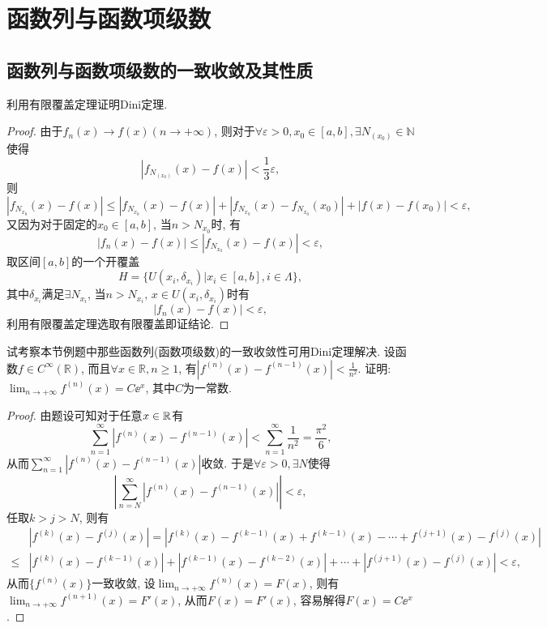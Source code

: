 \chapter{函数列与函数项级数}
\section{函数列与函数项级数的一致收敛及其性质}
\begin{quiza}
\woe 利用有限覆盖定理证明Dini定理.
\begin{proof}
由于\(f_n(x)\rightarrow f(x)(n\rightarrow+\infty)\), 则对于\(\forall\varepsilon>0,x_0\in [a,b],\exists N_{(x_0)}\in\mathbb{N}\)使得\[\left|f_{N_{(x_0)}}(x)-f(x)\right|<\frac{1}{3}\varepsilon,\]则\[\left|f_{N_{x_0}}(x)-f(x)\right|\leqslant\left|f_{N_{x_0}}(x)-f(x)\right|+\left|f_{N_{x_0}}(x)-f_{N_{x_0}}(x_0)\right|+\left|f(x)-f(x_0)\right|<\varepsilon,\]又因为对于固定的\(x_0\in [a,b]\), 当\(n>N_{x_0}\)时, 有\[\left|f_n(x)-f(x)\right|\leqslant\left|f_{N_{x_0}}(x)-f(x)\right|<\varepsilon,\]取区间\([a,b]\)的一个开覆盖\[H=\{U(x_i,\delta_{x_i})\big| x_i\in[a,b],i\in\Lambda\},\]其中\(\delta_{x_i}\)满足\(\exists N_{x_i}\), 当\(n>N_{x_i},\, x\in U(x_i,\delta_{x_i})\)时有\[\left|f_n(x)-f(x)\right|<\varepsilon,\]利用有限覆盖定理选取有限覆盖即证结论.
\end{proof}
\woe 试考察本节例题中那些函数列(函数项级数)的一致收敛性可用Dini定理解决.
\woe 设函数\(f\in C^{\infty}(\mathbb{R})\), 而且\(\forall x\in\mathbb{R},n\geqslant 1\), 有\(\left|f^{(n)}(x)-f^{(n-1)}(x)\right|<\frac{1}{n^2}\). 证明: \(\lim_{n\rightarrow+\infty}f^{(n)}(x)=C\ee^x\), 其中\(C\)为一常数.
\begin{proof}
由题设可知对于任意\(x\in\mathbb{R}\)有\[\sum_{n=1}^{\infty}\left|f^{(n)}(x)-f^{(n-1)}(x)\right|<\sum_{n=1}^{\infty}\frac{1}{n^2}=\frac{\pi^2}{6},\]从而\(\sum_{n=1}^{\infty}\left|f^{(n)}(x)-f^{(n-1)}(x)\right|\)收敛. 于是\(\forall\varepsilon>0,\exists N\)使得\[\left|\sum_{n=N}^{\infty}\left|f^{(n)}(x)-f^{(n-1)}(x)\right|\right|<\varepsilon,\]任取\(k>j>N\), 则有\[\begin{split}
&\left|f^{(k)}(x)-f^{(j)}(x)\right|=\left|f^{(k)}(x)-f^{(k-1)}(x)+f^{(k-1)}(x)-\cdots+f^{(j+1)}(x)-f^{(j)}(x)\right|\\\leqslant&\left|f^{(k)}(x)-f^{(k-1)}(x)\right|+\left|f^{(k-1)}(x)-f^{(k-2)}(x)\right|+\cdots+\left|f^{(j+1)}(x)-f^{(j)}(x)\right|<\varepsilon,
\end{split}\]
从而\(\{f^{(n)}(x)\}\)一致收敛, 设\(\lim_{n\rightarrow+\infty}f^{(n)}(x)=F(x)\), 则有\(\lim_{n\rightarrow+\infty}f^{(n+1)}(x)=F'(x)\), 从而\(F(x)=F'(x)\), 容易解得\(F(x)=C\ee^x\).

\end{proof}
\end{quiza}
